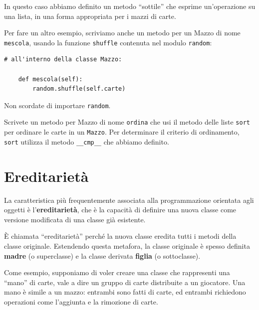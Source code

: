 \documentclass[10pt]{book}
\begin{document}
In questo caso abbiamo definito un metodo ``sottile'' che esprime un'operazione su una lista, in una forma appropriata per i mazzi di carte.

Per fare un altro esempio, scriviamo anche un metodo per un Mazzo di nome {\tt mescola}, usando la funzione {\tt shuffle} contenuta nel modulo {\tt random}:

\begin{verbatim}
# all'interno della classe Mazzo:
            
    def mescola(self):
        random.shuffle(self.carte)
\end{verbatim}
%
Non scordate di importare {\tt random}.

\vspace{0.2in}
\begin{exercise}

Scrivete un metodo per Mazzo di nome {\tt ordina} che usi il metodo delle liste {\tt sort} per ordinare le carte in un {\tt Mazzo}. Per determinare il criterio di ordinamento, {\tt sort} utilizza il metodo \verb"__cmp__" che abbiamo definito.
\end{exercise}



\section{Ereditarietà}

La caratteristica più frequentemente associata alla programmazione orientata agli oggetti è l'{\bf ereditarietà}, che è la capacità di definire una nuova classe come versione modificata di una classe già esistente.

È chiamata ``ereditarietà'' perché la nuova classe eredita tutti i metodi della classe originale. Estendendo questa metafora, la classe originale è spesso definita {\bf madre} (o superclasse) e la classe derivata {\bf figlia} (o sottoclasse).

Come esempio, supponiamo di voler creare una classe che rappresenti una ``mano'' di carte, vale a dire un gruppo di carte distribuite a un giocatore. Una mano è simile a un mazzo: entrambi sono fatti di carte, ed entrambi richiedono operazioni come l'aggiunta e la rimozione di carte.
\end{document}
